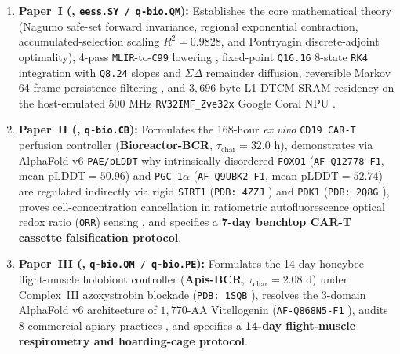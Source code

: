 \documentclass[11pt]{article}
\begin{document}
\begin{enumerate}
  \item \textbf{Paper~I (, \texttt{eess.SY / q-bio.QM}):} Establishes the core mathematical theory (Nagumo safe-set forward invariance, regional exponential contraction, accumulated-selection scaling $R^2 = 0.9828$, and Pontryagin discrete-adjoint optimality), 4-pass \texttt{MLIR}-to-\texttt{C99} lowering \cite{lattner2021mlir}, fixed-point \texttt{Q16.16} 8-state \texttt{RK4} integration with \texttt{Q8.24} slopes and $\Sigma\Delta$ remainder diffusion, reversible Markov 64-frame persistence filtering \cite{paulin2015concentration}, and $3{,}696\text{-byte}$ L1 DTCM SRAM residency on the host-emulated $500\text{ MHz}$ \texttt{RV32IMF\_Zve32x} Google Coral NPU \cite{waterman2014riscv}.
  \item \textbf{Paper~II (, \texttt{q-bio.CB}):} Formulates the 168-hour \textit{ex vivo} \texttt{CD19 CAR-T} perfusion controller (\textbf{Bioreactor-BCR}, $\tau_{\mathrm{char}} = 32.0\text{ h}$), demonstrates via AlphaFold v6 \texttt{PAE/pLDDT} \cite{jumper2021alphafold,varadi2024afdb} why intrinsically disordered \texttt{FOXO1} (\texttt{AF-Q12778-F1}, mean $\mathrm{pLDDT} = 50.96$) and \texttt{PGC-1$\alpha$} (\texttt{AF-Q9UBK2-F1}, mean $\mathrm{pLDDT} = 52.74$) are regulated indirectly via rigid \texttt{SIRT1} (\texttt{PDB: 4ZZJ} \cite{dai2015sirt1}) and \texttt{PDK1} (\texttt{PDB: 2Q8G} \cite{kato2007pdk1}), proves cell-concentration cancellation in ratiometric autofluorescence optical redox ratio (\texttt{ORR}) sensing \cite{walsh2021omi}, and specifies a \textbf{7-day benchtop CAR-T cassette falsification protocol}.
  \item \textbf{Paper~III (, \texttt{q-bio.QM / q-bio.PE}):} Formulates the 14-day honeybee flight-muscle holobiont controller (\textbf{Apis-BCR}, $\tau_{\mathrm{char}} = 2.08\text{ d}$) under Complex~III azoxystrobin blockade (\texttt{PDB: 1SQB} \cite{esser2006bc1,degrandi2015fungicides,bartlett2002strobilurin}), resolves the 3-domain AlphaFold v6 architecture of $1{,}770\text{-AA}$ Vitellogenin (\texttt{AF-Q868N5-F1} \cite{seehuus2006bee,leipart2022vitellogenin,havukainen2013vitellogenin}), audits 8 commercial apiary practices \cite{mao2013pcoumaric,leonard2020salvi,spannhoff2011hda}, and specifies a \textbf{14-day flight-muscle respirometry and hoarding-cage protocol}.

\end{enumerate}
\end{document}
